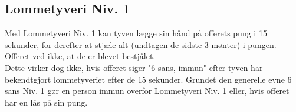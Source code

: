 \subsection*{Lommetyveri Niv. 1}
Med Lommetyveri Niv. 1 kan tyven lægge sin hånd på offerets pung i 15 sekunder, for derefter at stjæle alt (undtagen de sidste 3 mønter) i pungen. Offeret ved ikke, at de er blevet bestjålet. \\
Dette virker dog ikke, hvis offeret siger "6 sans, immun" efter tyven har bekendtgjort lommetyveriet efter de 15 sekunder. Grundet den generelle evne 6 sans Niv. 1 gør en person immun overfor Lommetyveri Niv. 1 eller, hvis offeret har en lås på sin pung.
